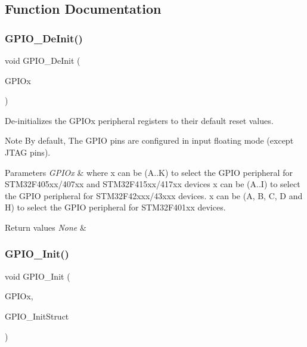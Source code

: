 \subsection{Function Documentation}
\mbox{\label{group___g_p_i_o_gaa60bdf3182c44b5fa818f237042f52ee}} 
\subsubsection{\texorpdfstring{G\+P\+I\+O\+\_\+\+De\+Init()}{GPIO\_DeInit()}}
{\footnotesize\ttfamily void G\+P\+I\+O\+\_\+\+De\+Init (\begin{DoxyParamCaption}\item[{G\+P\+I\+O\+\_\+\+Type\+Def $\ast$}]{G\+P\+I\+Ox }\end{DoxyParamCaption})}



De-\/initializes the G\+P\+I\+Ox peripheral registers to their default reset values. 

\begin{DoxyNote}{Note}
By default, The G\+P\+IO pins are configured in input floating mode (except J\+T\+AG pins). 
\end{DoxyNote}

\begin{DoxyParams}{Parameters}
{\em G\+P\+I\+Ox} & where x can be (A..K) to select the G\+P\+IO peripheral for S\+T\+M32\+F405xx/407xx and S\+T\+M32\+F415xx/417xx devices x can be (A..I) to select the G\+P\+IO peripheral for S\+T\+M32\+F42xxx/43xxx devices. x can be (A, B, C, D and H) to select the G\+P\+IO peripheral for S\+T\+M32\+F401xx devices. ~\newline
\\
\hline
\end{DoxyParams}

\begin{DoxyRetVals}{Return values}
{\em None} & \\
\hline
\end{DoxyRetVals}
\mbox{\label{group___g_p_i_o_ga71abf9404261370d03cca449b88d3a65}} 
\subsubsection{\texorpdfstring{G\+P\+I\+O\+\_\+\+Init()}{GPIO\_Init()}}
{\footnotesize\ttfamily void G\+P\+I\+O\+\_\+\+Init (\begin{DoxyParamCaption}\item[{G\+P\+I\+O\+\_\+\+Type\+Def $\ast$}]{G\+P\+I\+Ox,  }\item[{\mbox{\hyperlink{struct_g_p_i_o___init_type_def}{G\+P\+I\+O\+\_\+\+Init\+Type\+Def}} $\ast$}]{G\+P\+I\+O\+\_\+\+Init\+Struct }\end{DoxyParamCaption})}



